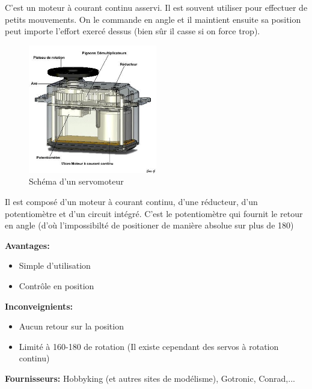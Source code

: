 \documentclass[a4paper, 11pt]{report}
\begin{document}
C'est un moteur à courant continu asservi. Il est souvent utiliser pour effectuer de petits mouvements. On le commande en angle et il maintient ensuite sa position peut importe l'effort exercé dessus (bien sûr il casse si on force trop).



\begin{figure}[h!]
\begin{centering}
\includegraphics[width=0.5\textwidth]{images/schemaServo.jpg}
\caption{Schéma d'un servomoteur}
\par\end{centering}
\end{figure}

Il est composé d'un moteur à courant continu, d'une réducteur, d'un potentiomètre et d'un circuit intégré. C'est le potentiomètre qui fournit le retour en angle (d'où l'impossibilté de positioner de manière absolue sur plus de 180\degre)

\textbf{Avantages:}
\begin{itemize}
\item Simple d'utilisation
\item Contrôle en position
\end{itemize}

\textbf{Inconveignients:}
\begin{itemize}
\item Aucun retour sur la position
\item Limité à 160-180 \degre de rotation (Il existe cependant des servos à rotation continu)
\end{itemize}

\textbf{Fournisseurs:} Hobbyking (et autres sites de modélisme), Gotronic, Conrad,...
\end{document}
